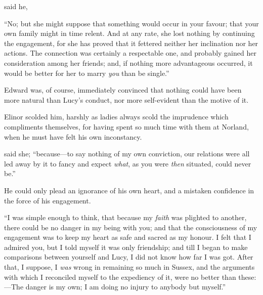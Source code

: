  said he, 

“No; but she might suppose that something would occur in your favour; that your own family might in time relent. And at any rate, she lost nothing by continuing the engagement, for she has proved that it fettered neither her inclination nor her actions. The connection was certainly a respectable one, and probably gained her consideration among her friends; and, if nothing more advantageous occurred, it would be better for her to marry {\em you} than be single.”

Edward was, of course, immediately convinced that nothing could have been more natural than Lucy's conduct, nor more self-evident than the motive of it.

Elinor scolded him, harshly as ladies always scold the imprudence which compliments themselves, for having spent so much time with them at Norland, when he must have felt his own inconstancy.

 said she; “because---to say nothing of my own conviction, our relations were all led away by it to fancy and expect {\em what}, as you were {\em then} situated, could never be.”

He could only plead an ignorance of his own heart, and a mistaken confidence in the force of his engagement.

“I was simple enough to think, that because my {\em faith} was plighted to another, there could be no danger in my being with you; and that the consciousness of my engagement was to keep my heart as safe and sacred as my honour. I felt that I admired you, but I told myself it was only friendship; and till I began to make comparisons between yourself and Lucy, I did not know how far I was got. After that, I suppose, I {\em was} wrong in remaining so much in Sussex, and the arguments with which I reconciled myself to the expediency of it, were no better than these:---The danger is my own; I am doing no injury to anybody but myself.”


